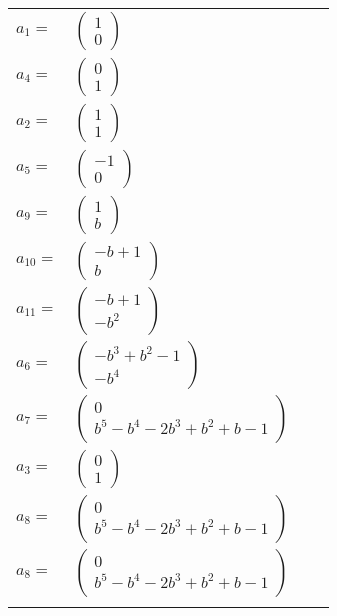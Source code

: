 \documentclass[1p]{elsarticle_modified}
\theoremstyle{definition}
\begin{document}
\begin{tabular}{m{7pt} m{180pt} m{7pt} m{180pt} }
\flushright $a_{1}=$&$\begin{pmatrix}1\\0\end{pmatrix}$ \\
\flushright $a_{4}=$&$\begin{pmatrix}0\\1\end{pmatrix}$ \\
\flushright $a_{2}=$&$\begin{pmatrix}1\\1\end{pmatrix}$ \\
\flushright $a_{5}=$&$\begin{pmatrix}-1\\0\end{pmatrix}$ \\
\flushright $a_{9}=$&$\begin{pmatrix}1\\b\end{pmatrix}$ \\
\flushright $a_{10}=$&$\begin{pmatrix}- b+1\\b\end{pmatrix}$ \\
\flushright $a_{11}=$&$\begin{pmatrix}- b+1\\- b^2\end{pmatrix}$ \\
\flushright $a_{6}=$&$\begin{pmatrix}- b^3+b^2-1\\- b^4\end{pmatrix}$ \\
\flushright $a_{7}=$&$\begin{pmatrix}0\\b^5- b^4-2 b^3+b^2+b-1\end{pmatrix}$ \\
\flushright $a_{3}=$&$\begin{pmatrix}0\\1\end{pmatrix}$ \\
\flushright $a_{8}=$&$\begin{pmatrix}0\\b^5- b^4-2 b^3+b^2+b-1\end{pmatrix}$\\ \flushright $a_{8}=$&$\begin{pmatrix}0\\b^5- b^4-2 b^3+b^2+b-1\end{pmatrix}$\\&\end{tabular}
\end{document}
